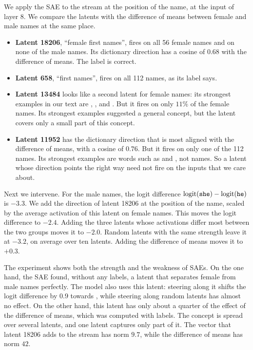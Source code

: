 \begin{experiment}\label{exp:genderlatents} 
We apply the SAE to the stream at the position of the name, at the input of layer 8. We compare the latents with
the difference of means between female and male names at the same place.
\begin{itemize}
\item \textbf{Latent 18206}, ``female first names'', fires on all 56 female names and on none of the male
names. Its dictionary direction has a cosine of $0.68$ with the difference of means. The label is correct.
\item \textbf{Latent 658}, ``first names'', fires on all 112 names, as its label says.
\item \textbf{Latent 13484} looks like a second latent for female names: its strongest examples in our text are
, ,  and . But it fires on only $11\%$ of the female names. Its strongest
examples suggested a general concept, but the latent covers only a small part of this concept.
\item \textbf{Latent 11952} has the dictionary direction that is most aligned with the difference of means, with
a cosine of $0.76$. But it fires on only one of the 112 names. Its strongest examples are words such as
 and , not names. So a latent whose direction points the right way need not fire on the
inputs that we care about.
\end{itemize}
Next we intervene. For the male names, the logit difference $\mathrm{logit}(\texttt{she})-\mathrm{logit}(\texttt{he})$ is $-3.3$. We add
the direction of latent 18206 at the position of the name, scaled by the average activation of this latent on
female names. This moves the logit difference to $-2.4$. Adding the three latents whose activations differ most
between the two groups moves it to $-2.0$. Random latents with the same strength leave it at $-3.2$, on average over
ten latents. Adding the difference of means moves it to $+0.3$.
\end{experiment}

The experiment shows both the strength and the weakness of SAEs. On the one hand, the SAE found, without any
labels, a latent that separates female from male names perfectly. The model also uses this latent: steering along
it shifts the logit difference by $0.9$ towards , while steering along random latents has almost no
effect. On the other hand, this latent has only about a quarter of the effect of the difference of means, which was
computed with labels. The concept is spread over several latents, and one latent captures only part of it. The
vector that latent 18206 adds to the stream has norm $9.7$, while the difference of means has norm $42$.

